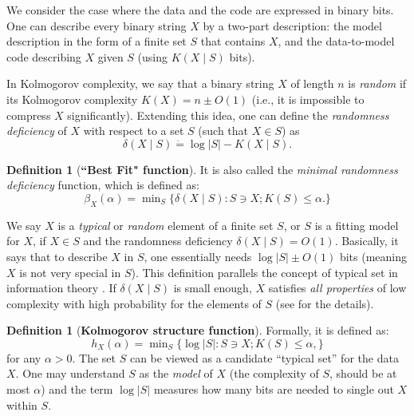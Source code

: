 \documentclass[11pt]{article}
\theoremstyle{plain}
\theoremstyle{definition}
\newtheorem{definition}[theorem]{Definition}
\begin{document}
We consider the case where the data and the code
are expressed in binary bits.
One can describe every binary string $X$ by a two-part description:
the model description in the form of a finite set $S$ that 
contains $X$, and the data-to-model code describing $X$
given $S$ (using $K(X\mid S)$ bits).

In Kolmogorov complexity, we say that a binary string $X$ 
of length $n$ is {\em random} if its Kolmogorov complexity $K(X)=n\pm O(1)$
(i.e., it is impossible to compress $X$ significantly).
Extending this idea, one can define the
{\em randomness deficiency} of $X$ with respect to a set $S$
(such that $X\in S$) as
$$
\delta(X\mid S)\dot{=}\log |S| - K(X\mid S).
$$

\begin{definition}[\textbf{``Best Fit" function}]
It is also called the {\em minimal randomness deficiency} function,
which is defined as:
$$
\beta_X(\alpha) = \min\nolimits_S
\{
\delta(X\mid S) : S \ni X; K(S)\leq \alpha.
\}
$$
\end{definition}
We say $X$ is a {\em typical} or {\em random} element
of a finite set $S$, or $S$ is a fitting model for $X$,
if $X\in S$ and the randomness deficiency
$\delta(X\mid S)=O(1)$.
Basically, it says that to describe $X$ in $S$,
one essentially needs $\log |S|\pm O(1)$ bits
(meaning $X$ is not very special in $S$).
This definition parallels the concept of typical set 
in information theory \cite[Ch. 3]{cover2006elements}.
If $\delta(X\mid S)$ is small enough,
$X$ satisfies {\em all properties} of low complexity
with high probability for the elements
of $S$ (see \citep{vereshchagin2004kolmogorov} for the details).



\begin{definition}[\textbf{Kolmogorov structure function}]
Formally, it is defined as:
$$
h_X(\alpha) = \min\nolimits_S
\{
\log |S| : S \ni X; K(S)\leq \alpha,
\}
$$
for any $\alpha>0$.
The set \(S\) can be viewed as a candidate “typical set” for the data \(X\). One may understand $S$ as the {\em model} of $X$
(the complexity of $S$, 
should be at most $\alpha$)
and the term \(\log\lvert S\rvert\) measures how many bits are needed to single out \(X\) within \(S\). 
\end{definition}
\end{document}
